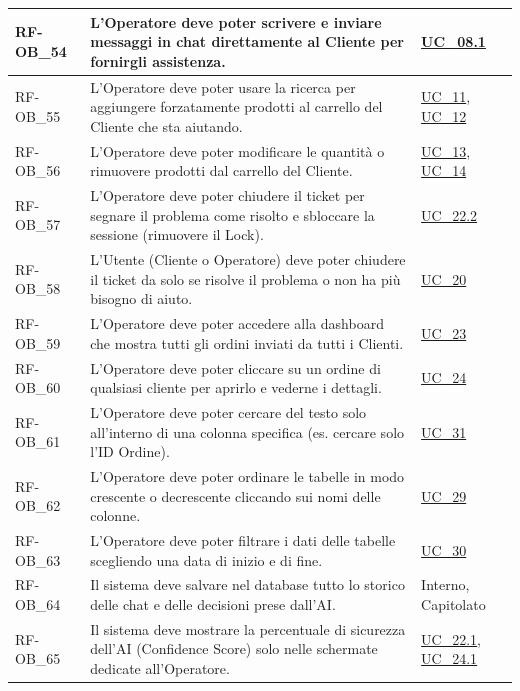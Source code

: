 \begin{longtable}{|>{\raggedright}p{}|>{\raggedright\arraybackslash}p{}|>{\raggedright\arraybackslash}p{}|}
    \hline
    RF-OB\_54 \hypertarget{rf-ob_54} & L'Operatore deve poter scrivere e inviare messaggi in chat direttamente al Cliente per fornirgli assistenza. & \hyperref[uc_08.1]{UC\_08.1} \\
    \hline
    RF-OB\_55 \hypertarget{rf-ob_55} & L'Operatore deve poter usare la ricerca per aggiungere forzatamente prodotti al carrello del Cliente che sta aiutando. & \hyperref[uc_11]{UC\_11}, \hyperref[uc_12]{UC\_12} \\
    \hline
    RF-OB\_56 \hypertarget{rf-ob_56} & L'Operatore deve poter modificare le quantità o rimuovere prodotti dal carrello del Cliente. & \hyperref[uc_13]{UC\_13}, \hyperref[uc_14]{UC\_14} \\
    \hline
    RF-OB\_57 \hypertarget{rf-ob_57} & L'Operatore deve poter chiudere il ticket per segnare il problema come risolto e sbloccare la sessione (rimuovere il Lock). & \hyperref[uc_22.2]{UC\_22.2} \\
    \hline
    RF-OB\_58 \hypertarget{rf-ob_58} & L'Utente (Cliente o Operatore) deve poter chiudere il ticket da solo se risolve il problema o non ha più bisogno di aiuto. & \hyperref[uc_20]{UC\_20} \\
    \hline
    RF-OB\_59 \hypertarget{rf-ob_59} & L'Operatore deve poter accedere alla dashboard che mostra tutti gli ordini inviati da tutti i Clienti. & \hyperref[uc_23]{UC\_23} \\
    \hline
    RF-OB\_60 \hypertarget{rf-ob_60} & L'Operatore deve poter cliccare su un ordine di qualsiasi cliente per aprirlo e vederne i dettagli. & \hyperref[uc_24]{UC\_24} \\
    \hline
    RF-OB\_61 \hypertarget{rf-ob_61} & L'Operatore deve poter cercare del testo solo all'interno di una colonna specifica (es. cercare solo l'ID Ordine). & \hyperref[uc_31]{UC\_31} \\
    \hline
    RF-OB\_62 \hypertarget{rf-ob_62} & L'Operatore deve poter ordinare le tabelle in modo crescente o decrescente cliccando sui nomi delle colonne. & \hyperref[uc_29]{UC\_29} \\
    \hline
    RF-OB\_63 \hypertarget{rf-ob_63} & L'Operatore deve poter filtrare i dati delle tabelle scegliendo una data di inizio e di fine. & \hyperref[uc_30]{UC\_30} \\
    \hline
    RF-OB\_64 \hypertarget{rf-ob_64} & Il sistema deve salvare nel database tutto lo storico delle chat e delle decisioni prese dall'AI. & Interno, Capitolato \\
    \hline
    RF-OB\_65 \hypertarget{rf-ob_65} & Il sistema deve mostrare la percentuale di sicurezza dell'AI (Confidence Score) solo nelle schermate dedicate all'Operatore. & \hyperref[uc_22.1]{UC\_22.1}, \hyperref[uc_24.1]{UC\_24.1} \\

\end{longtable}
